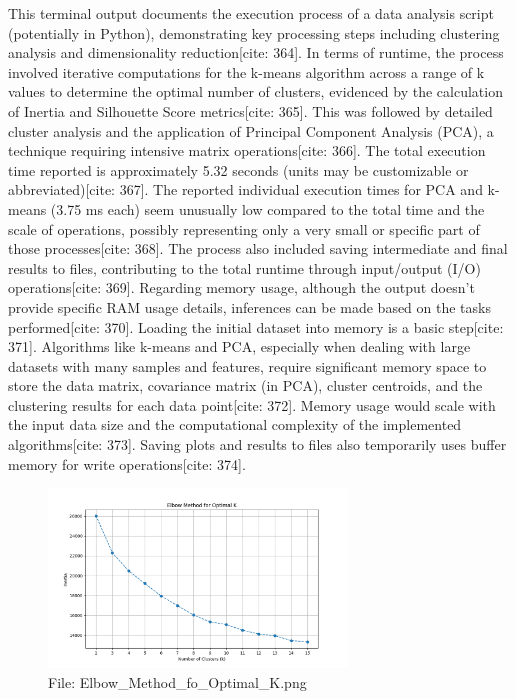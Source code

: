 \documentclass[12pt]{report}
\begin{document}
{{{This terminal output documents the execution process of a data analysis script (potentially in Python), demonstrating key processing steps including clustering analysis and dimensionality reduction[cite: 364]. In terms of runtime, the process involved iterative computations for the k-means algorithm across a range of k values to determine the optimal number of clusters, evidenced by the calculation of Inertia and Silhouette Score metrics[cite: 365]. This was followed by detailed cluster analysis and the application of Principal Component Analysis (PCA), a technique requiring intensive matrix operations[cite: 366]. The total execution time reported is approximately 5.32 seconds (units may be customizable or abbreviated)[cite: 367]. The reported individual execution times for PCA and k-means (3.75 ms each) seem unusually low compared to the total time and the scale of operations, possibly representing only a very small or specific part of those processes[cite: 368]. The process also included saving intermediate and final results to files, contributing to the total runtime through input/output (I/O) operations[cite: 369]. Regarding memory usage, although the output doesn't provide specific RAM usage details, inferences can be made based on the tasks performed[cite: 370]. Loading the initial dataset into memory is a basic step[cite: 371]. Algorithms like k-means and PCA, especially when dealing with large datasets with many samples and features, require significant memory space to store the data matrix, covariance matrix (in PCA), cluster centroids, and the clustering results for each data point[cite: 372]. Memory usage would scale with the input data size and the computational complexity of the implemented algorithms[cite: 373]. Saving plots and results to files also temporarily uses buffer memory for write operations[cite: 374].\\
\begin{figure}[h]
    \centering
    \includegraphics[width=300px]{Elbow_Method_fo_Optimal_K.png}
    \caption{File: Elbow\_Method\_fo\_Optimal\_K.png}
    \label{fig:Elbow}

\end{figure}}}}
\end{document}
